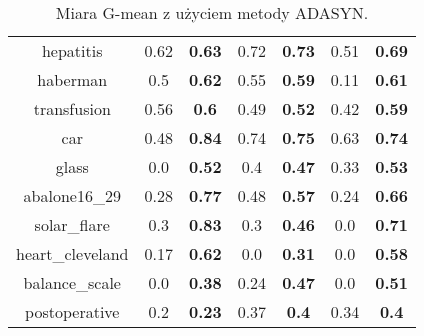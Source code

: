 \begin{table}[H]
\begin{center}
{\begin{tabular}{c|cccccc}
					hepatitis&0.62&\textbf{0.63}&0.72&\textbf{0.73}&0.51&\textbf{0.69}\\%
					haberman&0.5&\textbf{0.62}&0.55&\textbf{0.59}&0.11&\textbf{0.61}\\%
					transfusion&0.56&\textbf{0.6}&0.49&\textbf{0.52}&0.42&\textbf{0.59}\\%
					car&0.48&\textbf{0.84}&0.74&\textbf{0.75}&0.63&\textbf{0.74}\\%
					glass&0.0&\textbf{0.52}&0.4&\textbf{0.47}&0.33&\textbf{0.53}\\%
					abalone16\_29&0.28&\textbf{0.77}&0.48&\textbf{0.57}&0.24&\textbf{0.66}\\%
					solar\_flare&0.3&\textbf{0.83}&0.3&\textbf{0.46}&0.0&\textbf{0.71}\\%
					heart\_cleveland&0.17&\textbf{0.62}&0.0&\textbf{0.31}&0.0&\textbf{0.58}\\%
					balance\_scale&0.0&\textbf{0.38}&0.24&\textbf{0.47}&0.0&\textbf{0.51}\\%
					postoperative&0.2&\textbf{0.23}&0.37&\textbf{0.4}&0.34&\textbf{0.4}\\%
				\end{tabular}}
				\caption{Miara G-mean z użyciem metody ADASYN.}
				\label{gmeanadasyn}
			\end{center}
		\end{table}
		
